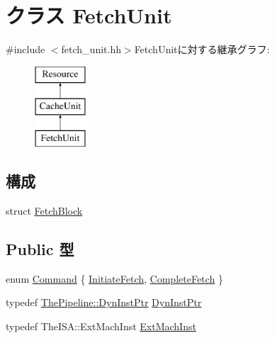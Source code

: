 \hypertarget{classFetchUnit}{
\section{クラス FetchUnit}
\label{classFetchUnit}
}


{\ttfamily \#include $<$fetch\_\-unit.hh$>$}FetchUnitに対する継承グラフ:\begin{figure}[H]
\begin{center}
\leavevmode
\includegraphics[height=3cm]{classFetchUnit}
\end{center}
\end{figure}
\subsection*{構成}
\begin{DoxyCompactItemize}
\item 
struct \hyperlink{structFetchUnit_1_1FetchBlock}{FetchBlock}
\end{DoxyCompactItemize}
\subsection*{Public 型}
\begin{DoxyCompactItemize}
\item 
enum \hyperlink{classFetchUnit_a2afce0a47a93eee73a314d53e4890153}{Command} \{ \hyperlink{classFetchUnit_a2afce0a47a93eee73a314d53e4890153a36b8c84ed26a9bbdd1dd1dd457fda0f4}{InitiateFetch}, 
\hyperlink{classFetchUnit_a2afce0a47a93eee73a314d53e4890153aa6cf31a29793ec4c8f38a24da999cdc2}{CompleteFetch}
 \}
\item 
typedef \hyperlink{classRefCountingPtr}{ThePipeline::DynInstPtr} \hyperlink{classFetchUnit_af9d0c8a46736ba6aa2d8bb94da1a5e73}{DynInstPtr}
\item 
typedef TheISA::ExtMachInst \hyperlink{classFetchUnit_a5605d4fc727eae9e595325c90c0ec108}{ExtMachInst}
\end{DoxyCompactItemize}
